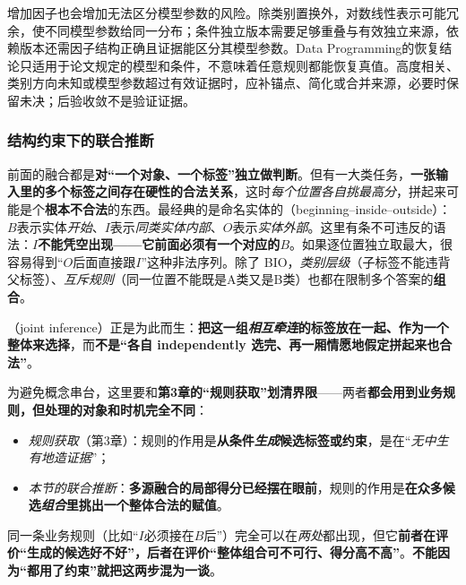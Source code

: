 增加因子也会增加无法区分模型参数的风险。除类别置换外，对数线性表示可能冗余，使不同模型参数给同一分布；条件独立版本需要足够重叠与有效独立来源，依赖版本还需因子结构正确且证据能区分其模型参数。Data Programming的恢复结论只适用于论文规定的模型和条件，不意味着任意规则都能恢复真值。高度相关、类别方向未知或模型参数超过有效证据时，应补锚点、简化或合并来源，必要时保留未决；后验收敛不是验证证据。

\subsubsection{结构约束下的联合推断}
\label{sec:knowledge-fusion-structured-inference}

前面的融合都是\textbf{对“一个对象、一个标签”独立做判断}。但有一大类任务，\textbf{一张输入里的多个标签之间存在硬性的合法关系}，这时\emph{每个位置各自挑最高分}，拼起来可能是个\textbf{根本不合法}的东西。最经典的是命名实体的（beginning--inside--outside）：$B$表示实体\emph{开始}、$I$表示\emph{同类实体内部}、$O$表示\emph{实体外部}。这里有条不可违反的语法：\textbf{$I$不能凭空出现——它前面必须有一个对应的$B$}。如果逐位置独立取最大，很容易得到“$O$后面直接跟$I$”这种非法序列。除了 BIO，\emph{类别层级}（子标签不能违背父标签）、\emph{互斥规则}（同一位置不能既是A类又是B类）也都在限制多个答案的\textbf{组合}。

（joint inference）正是为此而生：\textbf{把这一组\emph{相互牵连}的标签放在一起、作为一个整体来选择}，而\textbf{不是“各自 independently 选完、再一厢情愿地假定拼起来也合法”}。

为避免概念串台，这里要和\textbf{第3章的“规则获取”划清界限}——两者\textbf{都会用到业务规则，但处理的对象和时机完全不同}：
\begin{itemize}\item \emph{规则获取}（第3章）：规则的作用是\textbf{从条件\emph{生成}候选标签或约束}，是在“\emph{无中生有地造证据}”；\item \emph{本节的联合推断}：\textbf{多源融合的局部得分已经摆在眼前}，规则的作用是\textbf{在众多候选\emph{组合}里挑出一个整体合法的赋值}。\end{itemize}
同一条业务规则（比如“$I$必须接在$B$后”）完全可以在\emph{两处}都出现，但它\textbf{前者在评价“生成的候选好不好”，后者在评价“整体组合可不可行、得分高不高”}。\textbf{不能因为“都用了约束”就把这两步混为一谈}。

